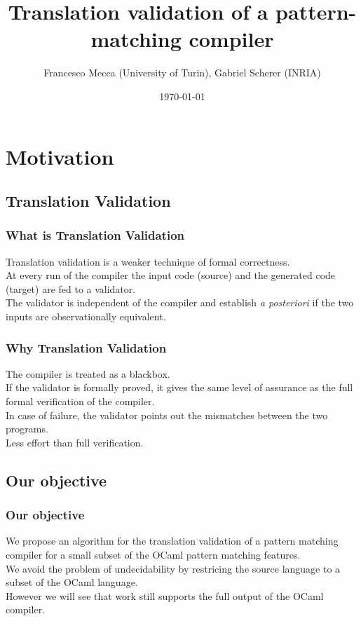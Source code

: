 \documentclass{beamer}
\title{Translation validation of a pattern-matching compiler}
\subtitle{}
\author{Francesco Mecca (University of Turin), Gabriel Scherer (INRIA)}
\date{\today}
\begin{document}

\begin{frame}
  \titlepage
\end{frame}

\section{Motivation}
\subsection{Translation Validation}

\begin{frame}
  \frametitle{What is Translation Validation}
  Translation validation is a  weaker technique of formal correctness. \\
  At every run of the compiler the input code (source) and the generated code (target) are fed to a
  validator. \\
  The validator is independent of the compiler and establish
  \emph{a posteriori} if the two inputs are observationally
  equivalent.
\end{frame}
\begin{frame}
  \frametitle{Why Translation Validation}
  The compiler is treated as a blackbox. \\
  If the validator is formally proved, it gives the same level of
  assurance as the full formal verification of the compiler. \\
  In case of failure, the validator points out the mismatches between
  the two programs. \\
  Less effort than full verification.
\end{frame}

\subsection{Our objective}
\begin{frame}
  \frametitle{Our objective}
We propose an algorithm for the translation validation of a pattern
matching compiler for a small subset of the OCaml pattern
matching features. \\
We avoid the problem of undecidability by restricing the source
language to a subset of the OCaml language.\\
However we will see that work still supports the full output of the
OCaml compiler.
\end{frame}
\end{document}
